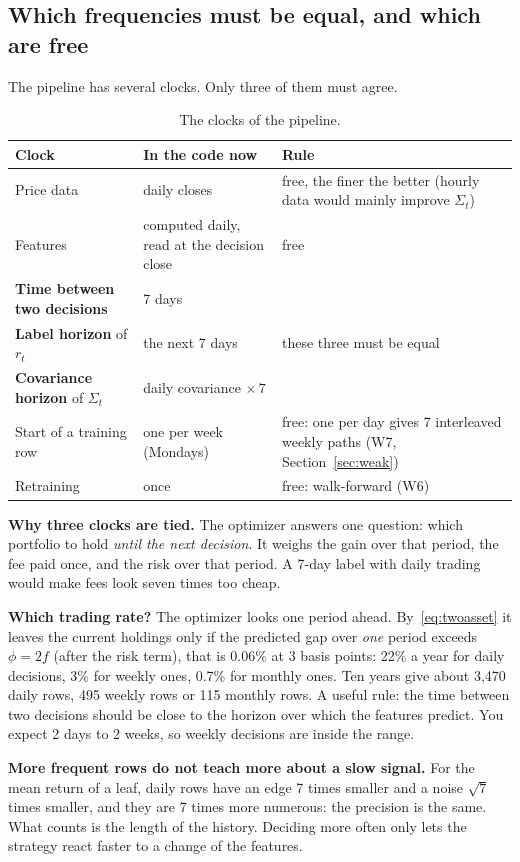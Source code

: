 \documentclass[11pt,a4paper]{article}
\newcommand{\1}{\mathbf{1}}
\begin{document}
\subsection{Which frequencies must be equal, and which are free}\label{sec:clocks}
The pipeline has several clocks. Only three of them must agree.
\begin{table}[H]
\centering\small
\begin{tabularx}{\linewidth}{@{}l l L@{}}
\toprule
Clock & In the code now & Rule\\
\midrule
Price data & daily closes & free, the finer the better (hourly data would mainly improve $\Sigma_t$)\\
Features & computed daily, read at the decision close & free\\
\textbf{Time between two decisions} & 7 days & \\
\textbf{Label horizon} of $r_t$ & the next 7 days & these three must be equal\\
\textbf{Covariance horizon} of $\Sigma_t$ & daily covariance $\times\,7$ & \\
Start of a training row & one per week (Mondays) & free: one per day gives 7 interleaved weekly paths (W7, Section~\ref{sec:weak})\\
Retraining & once & free: walk-forward (W6)\\
\bottomrule
\end{tabularx}
\caption{The clocks of the pipeline.}
\end{table}
\textbf{Why three clocks are tied.} The optimizer answers one question: which portfolio to hold \emph{until the next decision}. It weighs the gain over that period, the fee paid once, and the risk over that period. A 7-day label with daily trading would make fees look seven times too cheap.

\textbf{Which trading rate?} The optimizer looks one period ahead. By~\eqref{eq:twoasset} it leaves the current holdings only if the predicted gap over \emph{one} period exceeds $\phi=2f$ (after the risk term), that is 0.06\% at 3 basis points: 22\% a year for daily decisions, 3\% for weekly ones, 0.7\% for monthly ones. Ten years give about 3,470 daily rows, 495 weekly rows or 115 monthly rows. A useful rule: the time between two decisions should be close to the horizon over which the features predict. You expect 2 days to 2 weeks, so weekly decisions are inside the range.

\textbf{More frequent rows do not teach more about a slow signal.} For the mean return of a leaf, daily rows have an edge 7 times smaller and a noise $\sqrt7$ times smaller, and they are 7 times more numerous: the precision is the same. What counts is the length of the history. Deciding more often only lets the strategy react faster to a change of the features.
\end{document}
